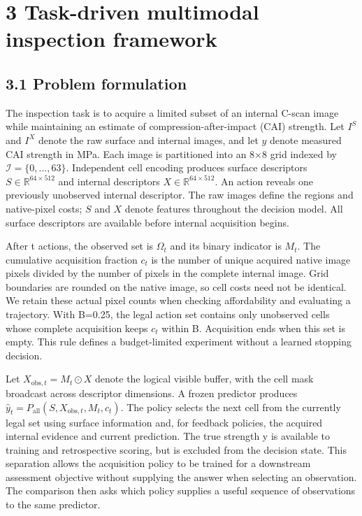 \hypertarget{task-driven-multimodal-inspection-framework}{%
\section{3 Task-driven multimodal inspection framework}\label{task-driven-multimodal-inspection-framework}}

\hypertarget{problem-formulation}{%
\subsection{3.1 Problem formulation}\label{problem-formulation}}

The inspection task is to acquire a limited subset of an internal C-scan image while maintaining an estimate of compression-after-impact (CAI) strength. Let \(I^S\) and \(I^X\) denote the raw surface and internal images, and let \(y\) denote measured CAI strength in MPa. Each image is partitioned into an 8×8 grid indexed by \(\mathcal{I}=\{0,\ldots,63\}\). Independent cell encoding produces surface descriptors \(S\in\mathbb{R}^{64\times512}\) and internal descriptors \(X\in\mathbb{R}^{64\times512}\). An action reveals one previously unobserved internal descriptor. The raw images define the regions and native-pixel costs; \(S\) and \(X\) denote features throughout the decision model. All surface descriptors are available before internal acquisition begins.

After t actions, the observed set is \(\Omega_t\) and its binary indicator is \(M_t\). The cumulative acquisition fraction \(c_t\) is the number of unique acquired native image pixels divided by the number of pixels in the complete internal image. Grid boundaries are rounded on the native image, so cell costs need not be identical. We retain these actual pixel counts when checking affordability and evaluating a trajectory. With B=0.25, the legal action set contains only unobserved cells whose complete acquisition keeps \(c_t\) within B. Acquisition ends when this set is empty. This rule defines a budget-limited experiment without a learned stopping decision.

Let \(X_{\mathrm{obs},t}=M_t\odot X\) denote the logical visible buffer, with the cell mask broadcast across descriptor dimensions. A frozen predictor produces \(\hat{y}_t=P_{\mathrm{all}}(S,X_{\mathrm{obs},t},M_t,c_t)\). The policy selects the next cell from the currently legal set using surface information and, for feedback policies, the acquired internal evidence and current prediction. The true strength y is available to training and retrospective scoring, but is excluded from the decision state. This separation allows the acquisition policy to be trained for a downstream assessment objective without supplying the answer when selecting an observation. The comparison then asks which policy supplies a useful sequence of observations to the same predictor.

